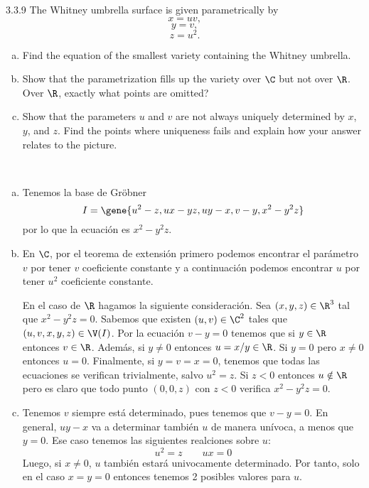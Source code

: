 \documentclass[twoside]{article}
\begin{document}
\begin{ejercicio}{3.3.9}
The Whitney umbrella surface is given parametrically by
\[x = uv,\]
\[y = v,\]
\[z = u^2.\]
\begin{enumerate}[a.]
\item Find the equation of the smallest variety containing the Whitney umbrella.
\item Show that the parametrization fills up the variety over $\C$ but not over $\R$. Over $\R$,
exactly what points are omitted?
\item Show that the parameters $u$ and $v$ are not always uniquely determined by $x$, $y$, and $z$.
Find the points where uniqueness fails and explain how your answer relates to the
picture.
\end{enumerate}
\end{ejercicio}
\begin{solucion}\
\begin{enumerate}[a.]
\item Tenemos la base de Gröbner 
\[
I =\gene{u^2 - z, ux - yz, uy - x, v - y, x^2 - y^2z}
\]
por lo que la ecuación es $x^2-y^2z$. 
\item En $\C$, por el teorema de extensión primero podemos encontrar el parámetro $v$ por tener $v$ coeficiente constante y a continuación podemos encontrar $u$ por tener $u^2$ coeficiente constante. 

En el caso de $\R$ hagamos la siguiente consideración. Sea $(x,y,z)\in \R^3$ tal que $x^2-y^2z=0$. Sabemos que existen $(u,v)\in\C^2$ tales que $(u,v,x,y,z)\in \V(I)$. Por la ecuación $v-y=0$ tenemos que si $y\in \R$ entonces $v\in \R$. Además, si $y\neq 0$ entonces $u=x/y\in \R$. Si $y=0$ pero $x\neq 0$ entonces $u=0$. Finalmente, si $y=v=x=0$, tenemos que todas las ecuaciones se verifican trivialmente, salvo $u^2=z$. Si $z<0$ entonces $u \notin \R$ pero es claro que todo punto $(0,0,z)$ con $z<0$ verifica $x^2-y^2z=0$.

\item Tenemos $v$ siempre está determinado, pues tenemos que $v-y=0$. En general, $uy-x$ va a determinar también $u$ de manera unívoca, a menos que $y=0$. Ese caso tenemos las siguientes realciones sobre $u$:
$$
u^2 = z \qquad ux = 0
$$
Luego, si $x\neq 0$, $u$ también estará univocamente determinado. Por tanto, solo en el caso $x=y=0$ entonces tenemos 2 posibles valores para $u$.
\end{enumerate}
\end{solucion}


\newpage
\end{document}
